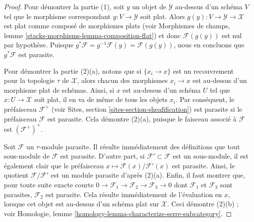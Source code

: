 \begin{proof}
Pour démontrer la partie (1), soit $y$ un objet de $\mathcal{Y}$ au-dessus
d'un schéma $V$ tel que le morphisme correspondant $y : V \to \mathcal{Y}$
soit plat. Alors $g(y) : V \to \mathcal{Y} \to \mathcal{X}$ est plat
comme composé de morphismes plats (voir
Morphismes de champs, lemme \ref{stacks-morphisms-lemma-composition-flat})
et donc $\mathcal{F}(g(y))$ est nul par hypothèse. Puisque
$g^*\mathcal{F} = g^{-1}\mathcal{F}(y) = \mathcal{F}(g(y))$, nous en concluons que
$g^*\mathcal{F}$ est parasite.

\medskip\noindent
Pour démontrer la partie (2)(a), notons que si $\{x_i \to x\}$ est un recouvrement pour la topologie $\tau$
de $\mathcal{X}$, alors chacun des morphismes $x_i \to x$ est au-dessus
d'un morphisme plat de schémas. Ainsi, si $x$ est au-dessus d'un schéma
$U$ tel que $x : U \to \mathcal{X}$ soit plat, il en va de même de tous les
objets $x_i$. Par conséquent, le préfaisceau $\mathcal{F}^+$ (voir
Sites, section \ref{sites-section-sheafification})
est parasite si le préfaisceau $\mathcal{F}$ est
parasite. Cela démontre (2)(a), puisque le faisceau associé à $\mathcal{F}$
est $(\mathcal{F}^+)^+$.

\medskip\noindent
Soit $\mathcal{F}$ un $\tau$-module parasite. Il résulte immédiatement des
définitions que tout sous-module de $\mathcal{F}$ est parasite. D'autre
part, si $\mathcal{F}' \subset \mathcal{F}$ est un sous-module, il est
également clair que le préfaisceau
$x \mapsto \mathcal{F}(x)/\mathcal{F}'(x)$
est parasite. Ainsi, le quotient $\mathcal{F}/\mathcal{F}'$ est un module
parasite d'après (2)(a). Enfin, il faut montrer que, pour toute suite exacte courte
$0 \to \mathcal{F}_1 \to \mathcal{F}_2 \to \mathcal{F}_3 \to 0$
dont $\mathcal{F}_1$ et $\mathcal{F}_3$ sont parasites, $\mathcal{F}_2$
est parasite. Cela résulte immédiatement de l'évaluation en $x$, lorsque cet objet est
au-dessus d'un schéma plat sur $\mathcal{X}$. Ceci démontre (2)(b) ; voir
Homologie, lemme \ref{homology-lemma-characterize-serre-subcategory}.


\end{proof}
